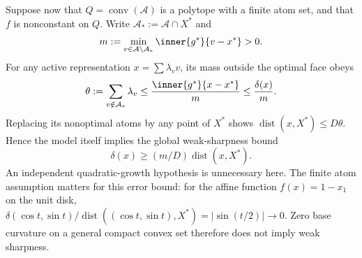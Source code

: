 Suppose now that $Q=\operatorname{conv}(\mathcal A)$ is a polytope
with a finite atom set, and that $f$ is nonconstant on $Q$.
Write $\mathcal A_*:=\mathcal A\cap X^*$ and
\begin{equation}\label{eq:atommargin}
 m:=\min_{v\in\mathcal A\setminus\mathcal A_*}
              \inner{g^*}{v-x^*}>0.
\end{equation}
For any active representation $x=\sum\lambda_vv$, its mass outside
the optimal face obeys
\begin{equation}\label{eq:badmass}
 \theta:=\sum_{v\notin\mathcal A_*}\lambda_v
 \le\frac{\inner{g^*}{x-x^*}}m\le\frac{\delta(x)}m.
\end{equation}
Replacing its nonoptimal atoms by any point of $X^*$ shows
$\operatorname{dist}(x,X^*)\le D\theta$. Hence the model itself
implies the global weak-sharpness bound
\[
 \delta(x)\ge(m/D)\operatorname{dist}(x,X^*).
\]
An independent quadratic-growth hypothesis is unnecessary here.
The finite atom assumption matters for this error bound: for the
affine function $f(x)=1-x_1$ on the unit disk,
$\delta(\cos t,\sin t)/\operatorname{dist}((\cos t,\sin t),X^*)
=|\sin(t/2)|\to0$. Zero base curvature on a general compact
convex set therefore does not imply weak sharpness.

